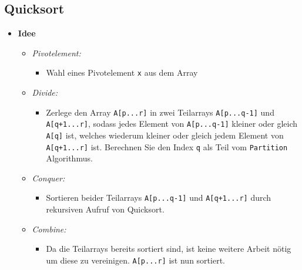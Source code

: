     
\subsection{Quicksort}
    \begin{itemize}
        \item \textbf{Idee}
            \begin{itemize}
                \item \textit{Pivotelement:}
                    \begin{itemize}
                        \item[]
                            Wahl eines Pivotelement \texttt{x} aus dem Array
                    \end{itemize}

                \item \textit{Divide:}
                    \begin{itemize}
                        \item[]
                            Zerlege den Array \texttt{A[p...r]} in zwei Teilarrays \texttt{A[p...q-1]} und \texttt{A[q+1...r]},
                            sodass jedes Element von \texttt{A[p...q-1]} kleiner oder gleich \texttt{A[q]} ist, welches
                            wiederum kleiner oder gleich jedem Element von \texttt{A[q+1...r]} ist. Berechnen Sie den Index \texttt{q}
                            als Teil vom \texttt{Partition} Algorithmus.
                    \end{itemize}

                \item \textit{Conquer:}
                    \begin{itemize}
                        \item[]
                            Sortieren beider Teilarrays \texttt{A[p...q-1]} und \texttt{A[q+1...r]} durch rekursiven Aufruf von
                            Quicksort.
                    \end{itemize}
                
                \item \textit{Combine:}
                    \begin{itemize}
                        \item[]
                            Da die Teilarrays bereits sortiert sind, ist keine weitere Arbeit nötig um diese zu vereinigen.
                            \texttt{A[p...r]} ist nun sortiert.
                    \end{itemize}
            \end{itemize}


\end{itemize}
